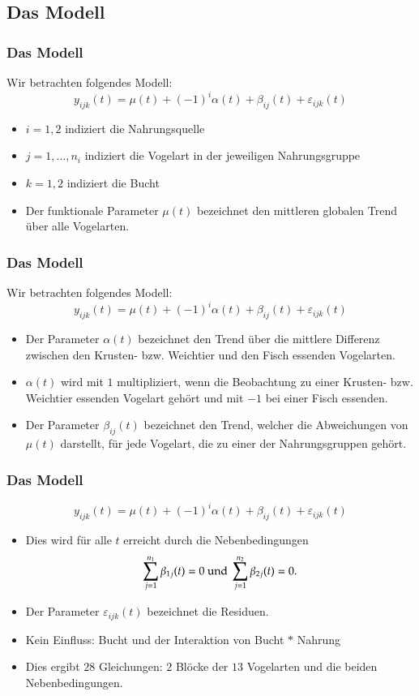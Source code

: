 \documentclass[xcolor=dvipsnames, compress, serif, professionalfont, handout]{beamer}
\begin{document}
%
%
\subsection{Das Modell}
\begin{frame}[fragile]
\frametitle{Das Modell}
Wir betrachten folgendes Modell:
$$
y_{ijk}(t) = \mu(t) + (-1)^{i} \alpha(t) + \beta_{ij}(t) + \varepsilon_{ijk}(t)
$$
\begin{itemize} 
  \item<1-> $i=1,2$ indiziert die Nahrungsquelle
  \item<2-> $j = 1,\ldots,n_i$ indiziert die Vogelart in der jeweiligen 
        Nahrungsgruppe
  \item<3-> $k = 1,2$ indiziert die Bucht
  \item<4-> Der funktionale Parameter $\mu(t)$ bezeichnet den mittleren globalen 
        Trend \"uber alle Vogelarten.
\end{itemize}
\end{frame}

%
%

\begin{frame}[fragile]
\frametitle{Das Modell}
Wir betrachten folgendes Modell:
$$
y_{ijk}(t) = \mu(t) + (-1)^{i} \alpha(t) + \beta_{ij}(t) + \varepsilon_{ijk}(t)
$$
\begin{itemize}  
  \item<1-> Der Parameter $\alpha(t)$ bezeichnet den Trend \"uber die mittlere
        Differenz zwischen den Krusten- bzw. Weichtier und den Fisch 
        essenden Vogelarten.
  \item<2-> $\alpha(t)$ wird mit $1$ multipliziert, wenn die Beobachtung zu einer Krusten- 
        bzw. Weichtier essenden Vogelart geh\"ort und mit $-1$ bei einer Fisch 
        essenden.
  \item<3-> Der Parameter $\beta_{ij}(t)$ bezeichnet den Trend, welcher die 
            Abweichungen von $\mu(t)$ darstellt, f\"ur jede Vogelart, die zu einer der 
            Nahrungsgruppen geh\"ort.
\end{itemize}
\end{frame}

%
%

\begin{frame}[fragile]
\frametitle{Das Modell}
$$
y_{ijk}(t) = \mu(t) + (-1)^{i} \alpha(t) + \beta_{ij}(t) + \varepsilon_{ijk}(t)
$$
\begin{itemize}  
  \item<1-> Dies wird f\"ur alle $t$ erreicht durch die Nebenbedingungen
        $$
          \sum\limits_{j=1}^{n_1}\beta_{1j}(t) = 0 \textnormal{ und } 
          \sum\limits_{j=1}^{n_2}\beta_{2j}(t) = 0.
        $$
  \item<2-> Der Parameter $\varepsilon_{ijk}(t)$ bezeichnet die Residuen.
  \item<3-> Kein Einfluss: Bucht und der Interaktion von Bucht $*$ Nahrung
  \item<4-> Dies ergibt $28$ Gleichungen: $2$ Bl\"ocke der $13$ Vogelarten und die 
        beiden Nebenbedingungen. 
\end{itemize}
\end{frame}
\end{document}
